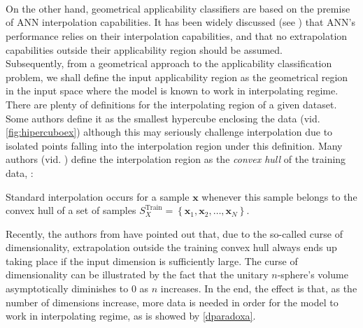 \paragraph{ \\}
On the other hand, geometrical applicability classifiers are based on the premise of ANN interpolation capabilities. It has been widely discussed (see \eg \cite{pmlr-v80-barrett18a,DBLP:journals/corr/abs-1711-00350,DBLP:journals/corr/abs-1904-01557}) that ANN's performance relies on their interpolation capabilities, and that no extrapolation capabilities outside their applicability region should be assumed.\\
%
\indent Subsequently, from a geometrical approach to the applicability classification problem, we shall define the input applicability region as the geometrical region in the input space where the model is known to work in interpolating regime.\\
%
\indent There are plenty of definitions for the interpolating region of a given dataset. Some authors define it as the smallest hypercube enclosing the data\cite{ebert2014interpolation} (vid. \cref{fig:hipercuboex}) although this may seriously challenge interpolation due to isolated points falling into the interpolation region under this definition. Many authors (vid. \cite{loh2007extrapolation,4505337}) define the interpolation region as the \textit{convex hull} of the training data, \ie:

\begin{definition}\cite{balestriero2021learning}\label{def:interpolacion}
	Standard interpolation occurs for a sample $\mathbf{x}$ whenever this sample belongs to the convex hull of a set of samples $S^\text{Train}_X=\left\{\mathbf{x}_1,\mathbf{x}_2,\ldots,\mathbf{x}_N\right\}$.
\end{definition}

\indent Recently, the authors from \cite{balestriero2021learning} have pointed out that, due to the so-called curse of dimensionality, extrapolation outside the training convex hull always ends up taking place if the input dimension is sufficiently large. The curse of dimensionality\cite[pp. 17-18]{Marsland2015Machine} can be illustrated by the fact that the unitary $n$-sphere's volume asymptotically diminishes to $0$ as $n$ increases. In the end, the effect is that, as the number of dimensions increase, more data is needed in order for the model to work in interpolating regime, as is showed by \autoref{dparadoxa}.\\

